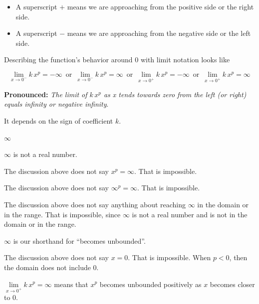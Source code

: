\documentclass{ximera}
\begin{document}
\begin{itemize}
\item A superscript $+$ means we are approaching from the positive side or the right side.
\item A superscript $-$ means we are approaching from the negative side or the left side.
\end{itemize}


Describing the function's behavior around $0$ with limit notation looks like




\[    \lim_{x \to 0^-} k \, x^p =  -\infty  \,   \text{ or }  \,     \lim_{x \to 0^-} k \, x^p = \infty   \,   \text{ or }  \,      \lim_{x \to 0^+} k \, x^p =  -\infty  \,   \text{ or }  \,     \lim_{x \to 0^+} k \, x^p = \infty   \]




\textbf{\textcolor{purple!85!blue}{Pronounced:}} \textit{The limit of $k \, x^p$ as x tends towards zero from the left (or right) equals infinity or negative infinity}.

It depends on the sign of coefficient $k$.







\begin{warning} \textbf{\textcolor{red!70!black}{$\infty$}}

$\infty$ is not a real number.

The discussion above does not say $x^p =  \infty$.  That is impossible.

The discussion above does not say $\infty^p =  \infty$.  That is impossible.


The discussion above does not say anything about reaching $\infty$ in the domain or in the range. That is impossible, since $\infty$ is not a real number and is not in the domain or in the range.

$\infty$ is our shorthand for ``becomes unbounded''.



The discussion above does not say $x =  0$.  That is impossible. When $p<0$, then the domain does not include $0$.



$\lim\limits_{x \to 0^+} k \, x^p =  \infty$ means that $x^p$ becomes unbounded positively as $x$ becomes closer to $0$.


\end{warning}
\end{document}
